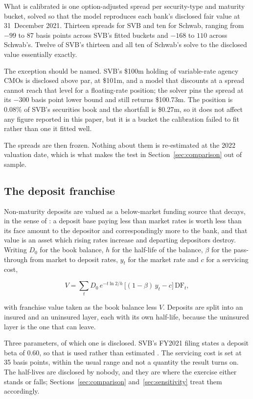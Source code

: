 What is calibrated is one option-adjusted spread per security-type and maturity
bucket, solved so that the model reproduces each bank's disclosed fair value at
31~December 2021. Thirteen spreads for SVB and ten for Schwab, ranging from $-99$ to
$87$ basis points across SVB's fitted buckets and $-168$ to $110$ across Schwab's.
Twelve of SVB's thirteen and all ten of Schwab's solve to the disclosed value
essentially exactly.

The exception should be named. SVB's \$100m holding of variable-rate agency CMOs is
disclosed above par, at \$101m, and a model that discounts at a spread cannot reach
that level for a floating-rate position; the solver pins the spread at its $-300$
basis point lower bound and still returns \$100.73m. The position is 0.08\% of SVB's
securities book and the shortfall is \$0.27m, so it does not affect any figure
reported in this paper, but it is a bucket the calibration failed to fit rather than
one it fitted well.

The spreads are then frozen. Nothing about them is re-estimated at the 2022 valuation
date, which is what makes the test in Section~\ref{sec:comparison} out of sample.

\subsection{The deposit franchise}

Non-maturity deposits are valued as a below-market funding source that decays, in the
sense of \citet{Drechsler2021}: a deposit base paying less than market rates is worth
less than its face amount to the depositor and correspondingly more to the bank, and
that value is an asset which rising rates increase and departing depositors destroy.
Writing $D_0$ for the book balance, $h$ for the half-life of the balance, $\beta$ for
the pass-through from market to deposit rates, $y_t$ for the market rate and $c$ for a
servicing cost,

\begin{equation}
V = \sum_t D_0 \, e^{-t \ln 2 / h} \,
    \bigl[(1 - \beta)\, y_t - c\bigr] \, \mathrm{DF}_t ,
\label{eq:deposits}
\end{equation}

with franchise value taken as the book balance less $V$. Deposits are split into an
insured and an uninsured layer, each with its own half-life, because the uninsured
layer is the one that can leave.

Three parameters, of which one is disclosed. SVB's FY2021 filing states a deposit
beta of 0.60, so that is used rather than estimated \citep{SVB10K2021}. The servicing
cost is set at 35 basis points, within the usual range and not a quantity the result
turns on. The half-lives are disclosed by nobody, and they are where the exercise
either stands or falls; Sections~\ref{sec:comparison} and~\ref{sec:sensitivity} treat
them accordingly.

